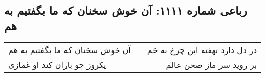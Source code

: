 \begin{center}
\section*{رباعی شماره ۱۱۱۱: آن خوش سخنان که ما بگفتیم به هم}
\label{sec:1111}
\begin{longtable}{l p{0.5cm} r}
آن خوش سخنان که ما بگفتیم به هم
&&
در دل دارد نهفته این چرخ به خم
\\
یکروز چو باران کند او غمازی
&&
بر روید سر ماز صحن عالم
\\
\end{longtable}
\end{center}
